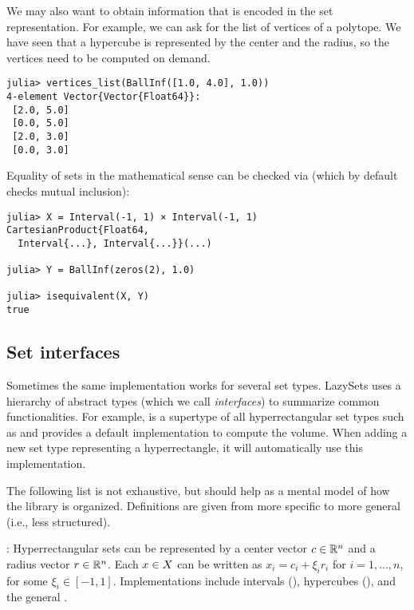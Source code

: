 We may also want to obtain information that is encoded in the set representation.
For example, we can ask for the list of vertices of a polytope.
We have seen that a hypercube is represented by the center and the radius, so the vertices need to be computed on demand.

\begin{minipage}{\linewidth}
\begin{lstlisting}
julia> vertices_list(BallInf([1.0, 4.0], 1.0))
4-element Vector{Vector{Float64}}:
 [2.0, 5.0]
 [0.0, 5.0]
 [2.0, 3.0]
 [0.0, 3.0]
\end{lstlisting}
\end{minipage}

Equality of sets in the mathematical sense can be checked via  (which by default checks mutual inclusion):

\begin{minipage}{\linewidth}
	\begin{lstlisting}
julia> X = Interval(-1, 1) × Interval(-1, 1)
CartesianProduct{Float64,
  Interval{...}, Interval{...}}(...)

julia> Y = BallInf(zeros(2), 1.0)

julia> isequivalent(X, Y)
true
\end{lstlisting}
\end{minipage}


\subsection{Set interfaces}

Sometimes the same implementation works for several set types.
LazySets uses a hierarchy of abstract types (which we call \emph{interfaces}) to summarize common functionalities.
For example,  is a supertype of all hyperrectangular set types such as  and provides a default implementation to compute the volume.
When adding a new set type representing a hyperrectangle, it will automatically use this implementation.

The following list is not exhaustive, but should help as a mental model of how the library is organized. Definitions are given from more specific to more general (i.e., less structured).

\smallskip

: Hyperrectangular sets can be represented by a center vector $c \in \mathbb{R}^n$ and a radius vector $r \in \mathbb{R}^n$. Each $x \in X$ can be written as $x_i = c_i + \xi_i r_i$ for $i = 1,\ldots, n$, for some $\xi_i \in [-1, 1]$. Implementations include intervals (), hypercubes (), and the general .

